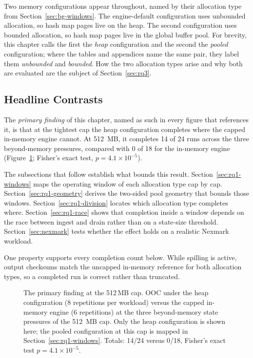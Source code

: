 Two memory configurations appear throughout, named by their allocation type from Section~\ref{sec:bg-windows}.
The engine-default configuration uses unbounded allocation, so hash map pages live on the heap.
The second configuration uses bounded allocation, so hash map pages live in the global buffer pool.
For brevity, this chapter calls the first the \emph{heap} configuration and the second the \emph{pooled} configuration; where the tables and appendices name the same pair, they label them \emph{unbounded} and \emph{bounded}.
How the two allocation types arise and why both are evaluated are the subject of Section~\ref{sec:rq3}.

\subsection{Headline Contrasts\label{sec:rq1-headline}}

The \emph{primary finding} of this chapter, named as such in every figure that references it, is that at the tightest cap the heap configuration completes where the capped in-memory engine cannot.
At 512\, MB, it completes 14 of 24 runs across the three beyond-memory pressures, compared with 0 of 18 for the in-memory engine (Figure~\ref{fig:flagship}; Fisher's exact test, $p = 4.1 \times 10^{-5}$).

The subsections that follow establish what bounds this result.
Section~\ref{sec:rq1-windows} maps the operating window of each allocation type cap by cap.
Section~\ref{sec:rq1-geometry} derives the two-sided pool geometry that bounds those windows.
Section~\ref{sec:rq1-division} locates which allocation type completes where.
Section~\ref{sec:rq1-race} shows that completion inside a window depends on the race between ingest and drain rather than on a state-size threshold.
Section~\ref{sec:nexmark} tests whether the effect holds on a realistic Nexmark workload.

One property supports every completion count below.
While spilling is active, output checksums match the uncapped in-memory reference for both allocation types, so a completed run is correct rather than truncated.

\begin{figure}[htbp]
\centering
{}
\caption[The primary finding (512\,MB)]{The primary finding at the 512\,MB
cap. \ac{OOC} under the heap configuration (8 repetitions per workload) versus
the capped in-memory engine (6 repetitions) at the three beyond-memory state
pressures of the 512\, MB cap. Only the heap configuration is shown here; the
pooled configuration at this cap is mapped in Section~\ref{sec:rq1-windows}.
Totals: 14/24 versus 0/18, Fisher's exact test
$p = 4.1 \times 10^{-5}$.\methodsnote}
\label{fig:flagship}
\end{figure}

